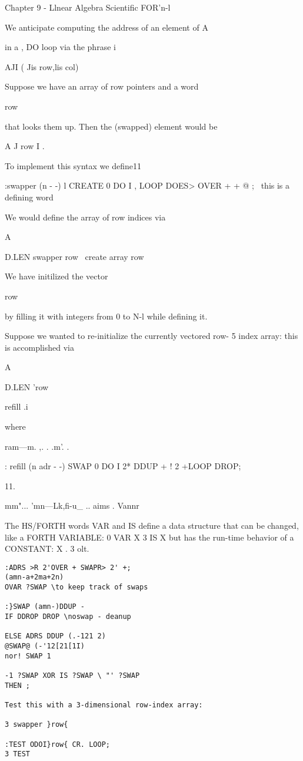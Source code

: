 {{{{Chapter 9 - Llnear Algebra Scientiﬁc FOR'n-l

We anticipate computing the address of an element of A{{ in a ,
DO loop via the phrase i

A{{JI}} ( Jis row,lis col)

Suppose we have an array of row pointers and a word }row{ that
looks them up. Then the (swapped) element would be

A{{ J }row{ I }}.

To implement this syntax we define11

:swapper (n - -) l
CREATE 0 DO I , LOOP
DOES> OVER + + @ ;
\ this is a deﬁning word

 

 

We would define the array of row indices via

A{{ D.LEN swapper }row{ \ create array }row{

We have initilized the vector }row{ by filling it with integers
from 0 to N-l while deﬁning it.

Suppose we wanted to re-initialize the currently vectored row- 5
index array: this is accomplished via

A{{ D.LEN '}row{ reﬁll .i

where

ram—m. ,. . .m'. .

: reﬁll (n adr - -)
SWAP 0 DO I 2* DDUP + !
2 +LOOP DROP;

 

11.

mm"... 'mn—Lk,ﬁ-u\_ .. aims . Vannr

The HS/FORTH words VAR and IS deﬁne a data structure that can be changed, like a FORTH
VARIABLE: 0 VAR X 3 IS X but has the run-time behavior of a CONSTANT: X . 3 olt.



\begin{verbatim}
:ADRS >R 2'OVER + SWAPR> 2' +;
(amn-a+2ma+2n)
OVAR ?SWAP \to keep track of swaps

:}SWAP (amn-)DDUP -
IF DDROP DROP \noswap - deanup

ELSE ADRS DDUP (.-121 2)
@SWAP@ (-'12[21[1I)
nor! SWAP 1

-1 ?SWAP XOR IS ?SWAP \ "' ?SWAP
THEN ;

Test this with a 3-dimensional row-index array:

3 swapper }row{

:TEST ODOI}row{ CR. LOOP;
3 TEST


\end{verbatim}}}}}}}}}}}

